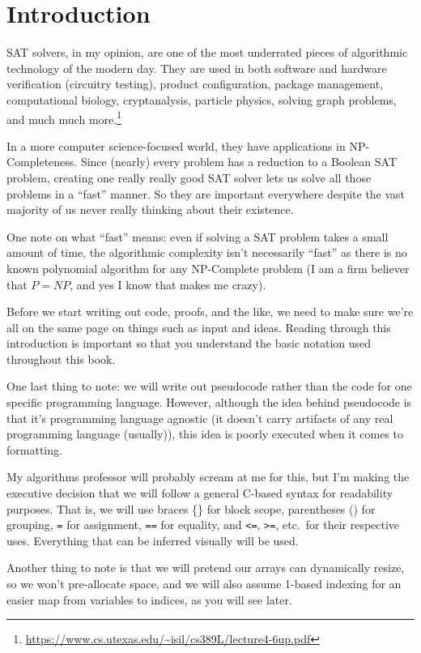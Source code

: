 \chapter{Introduction}

SAT solvers, in my opinion, are one of the most underrated pieces of algorithmic technology of the modern day. They are used in both software and hardware verification (circuitry testing), product configuration, package management, computational biology, cryptanalysis, particle physics, solving graph problems, and much much more.\footnote{\url{https://www.cs.utexas.edu/~isil/cs389L/lecture4-6up.pdf}}

In a more computer science-focused world, they have applications in NP-Completeness. Since (nearly) every problem has a reduction to a Boolean SAT problem, creating one really really good SAT solver lets us solve all those problems in a ``fast'' manner. So they are important everywhere despite the vast majority of us never really thinking about their existence.

One note on what ``fast'' means: even if solving a SAT problem takes a small amount of time, the algorithmic complexity isn't necessarily ``fast'' as there is no known polynomial algorithm for any NP-Complete problem (I am a firm believer that $P = NP$, and yes I know that makes me crazy).

Before we start writing out code, proofs, and the like, we need to make sure we're all on the same page on things such as input and ideas. Reading through this introduction is important so that you understand the basic notation used throughout this book.

One last thing to note: we will write out pseudocode rather than the code for one specific programming language. However, although the idea behind pseudocode is that it's programming language agnostic (it doesn't carry artifacts of any real programming language (usually)), this idea is poorly executed when it comes to formatting.

My algorithms professor will probably scream at me for this, but I'm making the executive decision that we will follow a general C-based syntax for readability purposes. That is, we will use braces \{\} for block scope, parentheses () for grouping, \verb|=| for assignment, \verb|==| for equality, and \verb|<=|, \verb|>=|, etc.\ for their respective uses. Everything that can be inferred visually will be used.

Another thing to note is that we will pretend our arrays can dynamically resize, so we won't pre-allocate space, and we will also assume 1-based indexing for an easier map from variables to indices, as you will see later.

